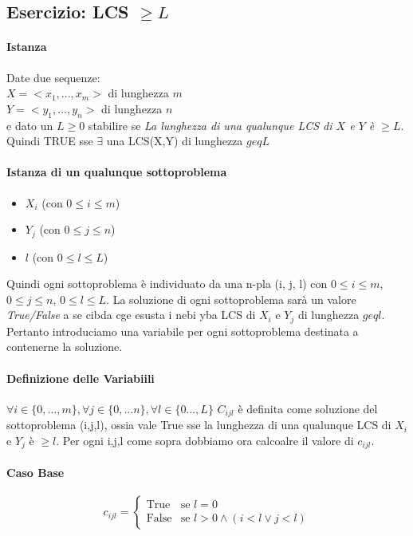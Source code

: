 \documentclass[12pt, a4paper, openany]{book}
\begin{document}
\subsection*{Esercizio: LCS $\geq L$}

\paragraph*{Istanza} Date due sequenze:\\
$X = <x_1,...,x_m>$ di lunghezza $m$\\
$Y = <y_1,...,y_n>$ di lunghezza $n$\\
e dato un $L \geq 0$ stabilire se \emph{La lunghezza di una qualunque LCS di $X$ e $Y$ è $\geq L$}.
\\Quindi TRUE sse $\exists$ una LCS(X,Y) di lunghezza $geq L$

\paragraph*{Istanza di un qualunque sottoproblema}
\begin{itemize}
	\item[] $X_i$ (con $0 \leq i \leq m$)
	\item[] $Y_j$ (con $0 \leq j \leq n$)
	\item[] $l$ (con $0 \leq l \leq L$)
\end{itemize}
Quindi ogni sottoproblema è individuato da una n-pla (i, j, l) con $0 \leq i \leq m$, $0 \leq j \leq n$, $0 \leq l \leq L$.
La soluzione di ogni sottoproblema sarà un valore \emph{True/False} a se cibda cge esusta i nebi yba LCS di $X_i$ e $Y_j$ di lunghezza $geq l$.
Pertanto introduciamo una variabile per ogni sottoproblema destinata a contenerne la soluzione.
\paragraph*{Definizione delle Variabiili}
$\forall i\in \{0,...,m\}, \forall j\in\{0,...n\}, \forall l\in \{0...,L\}$
$C_{ijl}$ è definita come soluzione del sottoproblema (i,j,l), ossia vale True sse la lunghezza di una qualunque LCS di $X_i$ e $Y_j$ è $\geq l$.
Per ogni i,j,l come sopra dobbiamo ora calcoalre il valore di $c_{ijl}$.
\paragraph*{Caso Base}
\begin{equation}
	c_{ijl} = \begin{cases}
		\text{True}  & \text{se $l = 0$}                     \\
		\text{False} & \text{se $l>0 \wedge (i<l \vee j<l)$}
	\end{cases}
\end{equation}
\end{document}
